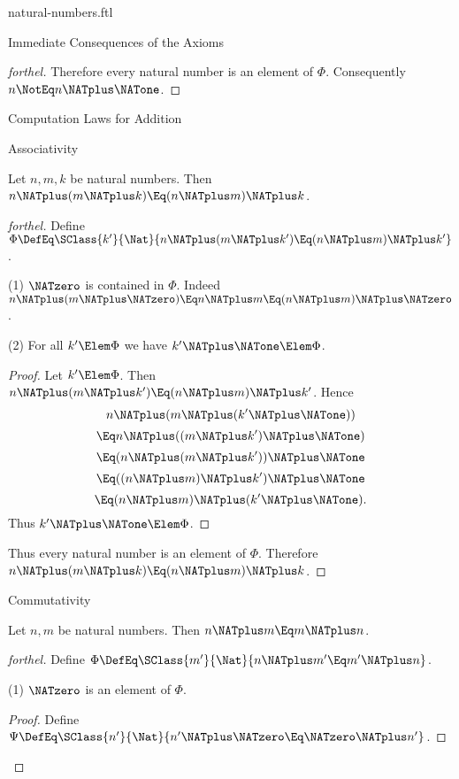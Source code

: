 \documentclass{stex}
\begin{document}
\begin{smodule}{natural-numbers.ftl}
\begin{sfragment}{Immediate Consequences of the Axioms}
\begin{proof}[forthel]
    Therefore every natural number is an element of $\Phi$.
    Consequently $n \NotEq n \NATplus \NATone$.
  \end{proof}
\end{sfragment}

\begin{sfragment}{Computation Laws for Addition}
  \begin{sfragment}{Associativity}
    \begin{proposition}[forthel]
      Let $n, m, k$ be natural numbers.
      Then $n \NATplus (m \NATplus k) \Eq (n \NATplus m) \NATplus k$.
    \end{proposition}
    \begin{proof}[forthel]
      Define $\Phi \DefEq \SClass{k'}{\Nat}{n \NATplus (m \NATplus k') \Eq (n \NATplus m) \NATplus k'}$.

      (1) $\NATzero$ is contained in $\Phi$.
      Indeed $n \NATplus (m \NATplus \NATzero) \Eq n \NATplus m \Eq (n \NATplus m) \NATplus \NATzero$.

      (2) For all $k' \Elem \Phi$ we have $k' \NATplus \NATone \Elem \Phi$.
      \begin{proof}
        Let $k' \Elem \Phi$.
        Then $n \NATplus (m \NATplus k') \Eq (n \NATplus m) \NATplus k'$.
        Hence
        \[  n \NATplus (m \NATplus (k' \NATplus \NATone))        \]
        \[    \Eq n \NATplus ((m \NATplus k') \NATplus \NATone)    \]
        \[    \Eq (n \NATplus (m \NATplus k')) \NATplus \NATone    \]
        \[    \Eq ((n \NATplus m) \NATplus k') \NATplus \NATone    \]
        \[    \Eq (n \NATplus m) \NATplus (k' \NATplus \NATone).   \]
        Thus $k' \NATplus \NATone \Elem \Phi$.
      \end{proof}

      Thus every natural number is an element of $\Phi$.
      Therefore $n \NATplus (m \NATplus k) \Eq (n \NATplus m) \NATplus k$.
    \end{proof}
  \end{sfragment}

  \begin{sfragment}{Commutativity}
    \begin{proposition}[forthel]
      Let $n, m$ be natural numbers.
      Then $n \NATplus m \Eq m \NATplus n$.
    \end{proposition}
    \begin{proof}[forthel]
      Define $\Phi \DefEq \SClass{m'}{\Nat}{n \NATplus m' \Eq m' \NATplus n}$.

      (1) $\NATzero$ is an element of $\Phi$.
      \begin{proof}
        Define $\Psi \DefEq \SClass{n'}{\Nat}{n' \NATplus \NATzero \Eq \NATzero \NATplus n'}$.


\end{proof}
\end{proof}
\end{sfragment}
\end{sfragment}
\end{smodule}
\end{document}
